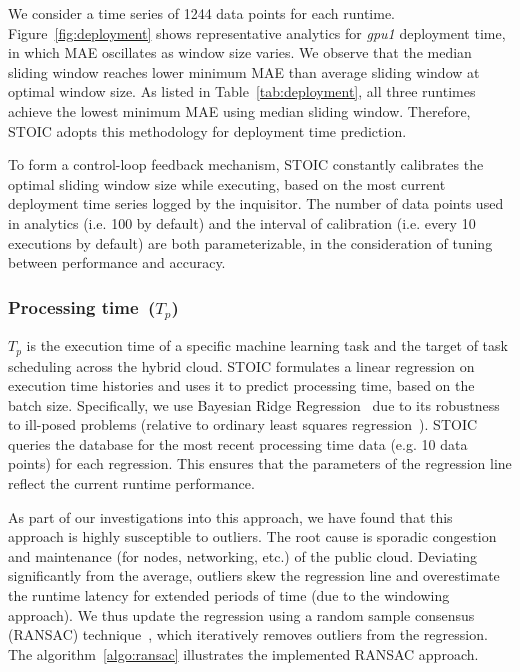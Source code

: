 We consider a time series of 1244 data points for each runtime.
Figure~\ref{fig:deployment} shows representative analytics for \textit{gpu1}
deployment time, in which MAE oscillates as window size varies. We observe
that the median sliding window reaches lower minimum MAE than average sliding
window at optimal window size. As listed in Table~\ref{tab:deployment}, all
three runtimes achieve the lowest minimum MAE using median sliding window.
Therefore, STOIC adopts this methodology for deployment time prediction. 

To form a control-loop feedback mechanism, STOIC constantly calibrates the
optimal sliding window size while executing, based on the most current
deployment time series logged by the inquisitor. The number of data points
used in analytics (i.e. 100 by default) and the interval of calibration (i.e.
every 10 executions by default) are both parameterizable, in the consideration
of tuning between performance and accuracy. 
 
\subsubsection{Processing time~($T_p$)} 

$T_p$ is the execution time of a
specific machine learning task and the target of task scheduling across the
hybrid cloud. STOIC formulates a linear regression on execution time histories
and uses it to predict processing time, based on the batch size. Specifically,
we use Bayesian Ridge Regression~\cite{ref:brr} due to its robustness to
ill-posed problems (relative to ordinary least squares
regression~\cite{ref:ols}). STOIC queries the database for the most recent
processing time data (e.g. 10 data points) for each regression. This ensures
that the parameters of the regression line reflect the current runtime
performance.
 
As part of our investigations into this approach, we have found that this
approach is highly susceptible to outliers. The root cause is sporadic
congestion and maintenance (for nodes, networking, etc.) of the public cloud.
Deviating significantly from the average, outliers skew the regression line
and overestimate the runtime latency for extended periods of time (due to the
windowing approach). We thus update the regression using a random sample
consensus (RANSAC) technique~\cite{ref:ransac}, which iteratively removes
outliers from the regression. The algorithm~\ref{algo:ransac} illustrates the
implemented RANSAC approach.

